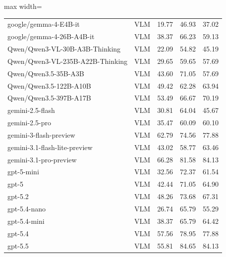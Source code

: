 \begin{table}[htbp!]
\begin{adjustbox}{max width=\textwidth}
\begin{tabular}{lllll}
google/gemma-4-E4B-it & VLM &  19.77 & 46.93 & 37.02  \\
google/gemma-4-26B-A4B-it & VLM & 38.37 & 66.23 & 59.13  \\
Qwen/Qwen3-VL-30B-A3B-Thinking & VLM &22.09 & 54.82 & 45.19  \\
Qwen/Qwen3-VL-235B-A22B-Thinking & VLM & 29.65 & 59.65 & 57.69  \\
Qwen/Qwen3.5-35B-A3B & VLM & 43.60 & 71.05 & 57.69  \\
Qwen/Qwen3.5-122B-A10B & VLM & 49.42 & 62.28 & 63.94  \\
Qwen/Qwen3.5-397B-A17B & VLM & 53.49 & 66.67 & 70.19 \\
gemini-2.5-flash & VLM &30.81 & 64.04 & 45.67 \\
gemini-2.5-pro & VLM &  35.47 & 60.09 & 60.10 \\
gemini-3-flash-preview & VLM & 62.79 & 74.56 & 77.88  \\
gemini-3.1-flash-lite-preview & VLM & 43.02 & 58.77 & 63.46  \\
gemini-3.1-pro-preview & VLM &  66.28 & 81.58 & 84.13 \\
gpt-5-mini & VLM &32.56 & 72.37 & 61.54 \\
gpt-5 & VLM & 42.44 & 71.05 & 64.90  \\
gpt-5.2 & VLM & 48.26 & 73.68 & 67.31\\
gpt-5.4-nano & VLM & 26.74 & 65.79 & 55.29  \\
gpt-5.4-mini & VLM  & 38.37 & 65.79 & 64.42 \\
gpt-5.4 & VLM & 57.56 & 78.95 & 77.88  \\
gpt-5.5 & VLM  & 55.81 & 84.65 & 84.13 \\
\bottomrule

\end{tabular} 
\end{adjustbox}
\end{table}
